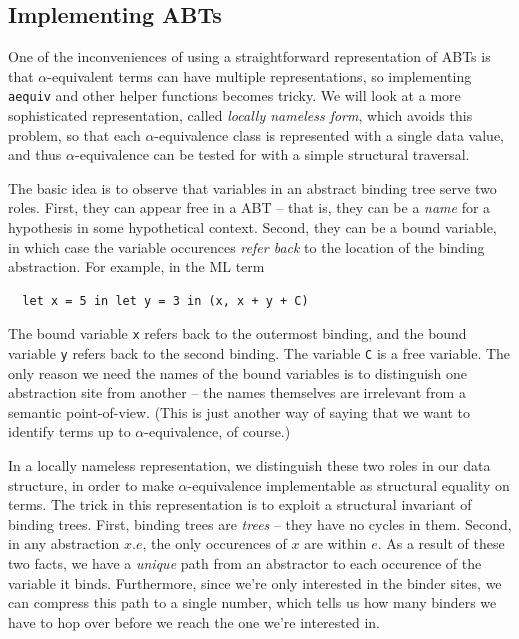 \documentclass[11pt]{article}
\begin{document}
\subsection{Implementing ABTs}

One of the inconveniences of using a straightforward representation
of ABTs is that $\alpha$-equivalent terms can have
multiple representations, so implementing \verb|aequiv| and other helper functions becomes tricky. We will look at a more sophisticated representation,
called \emph{locally nameless form}, which avoids this problem, so
that each $\alpha$-equivalence class is represented with a single
data value, and thus $\alpha$-equivalence can be tested for with a
simple structural traversal.

The basic idea is to observe that variables in an abstract binding
tree serve two roles. First, they can appear free in a ABT -- that is,
they can be a \emph{name} for a hypothesis in some hypothetical
context. Second, they can be a bound variable, in which case the variable
occurences \emph{refer back} to the location of the binding
abstraction. For example, in the ML term

\begin{verbatim}
  let x = 5 in let y = 3 in (x, x + y + C)
\end{verbatim}

The bound variable \texttt{x} refers back to the outermost binding,
and the bound variable \texttt{y} refers back to the second
binding. The variable \verb|C| is a free variable. The only reason we need the names of the bound variables is to distinguish one
abstraction site from another -- the names themselves are
irrelevant from a semantic point-of-view. (This is just another way of saying that we want to
identify terms up to $\alpha$-equivalence, of course.)

In a locally nameless representation, we distinguish these two roles
in our data structure, in order to make $\alpha$-equivalence
implementable as structural equality on terms.
The trick in this representation is to exploit a structural invariant
of binding trees. First, binding trees are \emph{trees} -- they have
no cycles in them. Second, in any abstraction $x.e$, the only
occurences of $x$ are within $e$.
As a result of these two facts, we have a \emph{unique} path from an
abstractor to each occurence of the variable it binds. Furthermore,
since we're only interested in the binder sites, we can compress this
path to a single number, which tells us how many binders we have to
hop over before we reach the one we're interested in.
\end{document}
